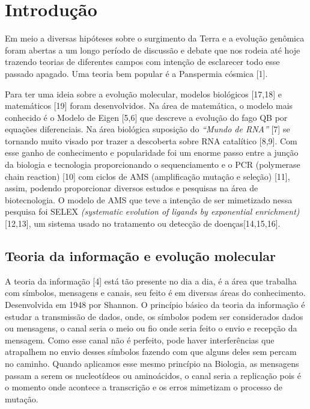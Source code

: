 \section{Introdução}

Em meio a diversas hipóteses sobre o surgimento da Terra e a evolução genômica
foram abertas a um longo período de discussão e debate que nos rodeia até hoje trazendo teorias de diferentes campos com intenção de esclarecer todo esse passado apagado. Uma teoria bem popular é a Panspermia cósmica [1]\citep{1}. 

Para ter uma ideia sobre a evolução molecular, modelos biológicos [17,18]\citep{17,18}  e
matemáticos [19]\citep{19} foram desenvolvidos. Na área de matemática, o modelo mais conhecido é o Modelo de Eigen [5,6]\citep{5,6} que descreve a evolução do fago QB por equações diferenciais. Na área biológica suposição do \emph{“Mundo de RNA”} [7]\citep{7} se tornando muito visado por trazer a descoberta sobre RNA catalítico [8,9]\citep{8,9}. Com esse ganho de conhecimento e popularidade foi um enorme passo entre a junção da biologia e tecnologia proporcionando o sequenciamento e o PCR (polymerase chain reaction) [10]\citep{10} com ciclos de AMS (amplificação mutação e seleção) [11]\citep{11}, assim, podendo proporcionar diversos estudos e pesquisas na área de biotecnologia. O modelo de AMS que teve a intenção de ser mimetizado nessa pesquisa foi SELEX \emph{(systematic evolution of ligands by exponential enrichment)} [12,13]\citep{12,13}, um sistema usado no tratamento ou detecção de doenças[14,15,16]\citep{14,15,16}.

\subsection{Teoria da informação e evolução molecular}
A teoria da informação [4]\citep{4} está tão presente no dia a dia, é a área que trabalha com símbolos, mensagens e canais, seu feito é em diversas áreas do conhecimento.
Desenvolvida em 1948 por Shannon. O princípio básico da teoria da informação é estudar a transmissão de dados, onde, os símbolos podem ser considerados dados ou mensagens, o canal seria o meio ou fio onde seria feito o envio e recepção da mensagem. Como esse canal não é perfeito, pode haver interferências que atrapalhem no envio desses símbolos fazendo com que alguns deles sem percam no caminho. Quando aplicamos esse mesmo princípio na Biologia, as mensagens passam a serem os nucleotídeos ou aminoácidos, o canal seria a replicação pois é o momento onde acontece a transcrição e os erros mimetizam o processo de mutação.

